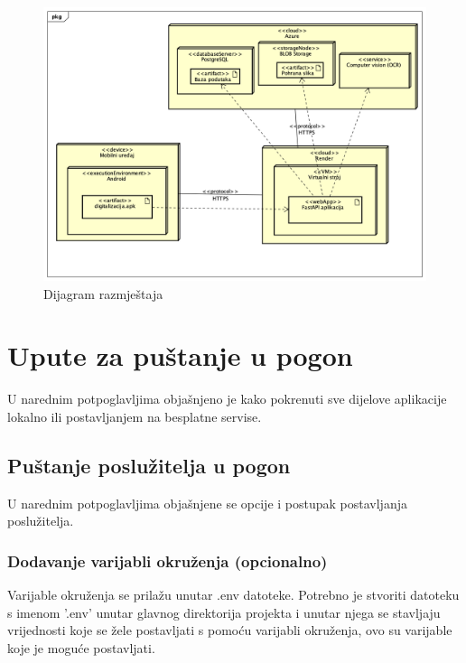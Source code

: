 			 \begin{figure}[H]
			 	\includegraphics[width=\textwidth]{slike/dijagramRazmjestaja.png}
			 	\caption{Dijagram razmještaja}
			 	\label{fig:dijagramRazmjestaja}
			 \end{figure}		
			
			\eject 
		
		\section{Upute za puštanje u pogon}
		
			{U narednim potpoglavljima objašnjeno je kako pokrenuti sve dijelove aplikacije lokalno ili postavljanjem na besplatne servise.}
		
			\subsection{Puštanje poslužitelja u pogon}
			
			{U narednim potpoglavljima objašnjene se opcije i postupak postavljanja poslužitelja.}
			
			\subsubsection{Dodavanje varijabli okruženja (opcionalno)}
			
			{Varijable okruženja se prilažu unutar .env datoteke. Potrebno je stvoriti datoteku s imenom '.env' unutar glavnog direktorija projekta i unutar njega se stavljaju vrijednosti koje se žele postavljati s pomoću varijabli okruženja, ovo su varijable koje je moguće postavljati.}
			
